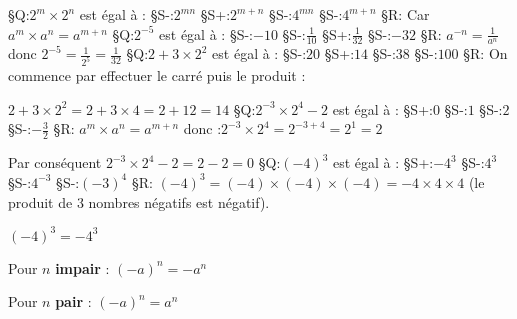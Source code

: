 
%
§Q:$2^{m}\times 2^{n}$ est égal à :
§S-:$2^{mn}$
§S+:$2^{m+n}$
§S-:$4^{mn}$
§S-:$4^{m+n}$
§R: Car $a^{m}\times a^{n}=a^{m+n}$
§Q:$2^{-5}$ est égal à :
§S-:$-10$
§S-:$\frac{1}{10}$
§S+:$\frac{1}{32}$
§S-:$-32$
§R: $a^{-n}=\frac{1}{a^{n}}$ donc $2^{-5}=\frac{1}{2^{5}}=\frac{1}{32}$
§Q:$2+3\times 2^{2}$ est égal à :
§S-:$20$
§S+:$14$
§S-:$38$
§S-:$100$
§R: On commence par effectuer le carré puis le produit :
\par
$2+3\times 2^{2} =2+3\times 4=2+12=14$
§Q:$2^{-3}\times 2^{4}-2$ est égal à :
§S+:$0$
§S-:$1$
§S-:$2$
§S-:$-\frac{3}{2}$
§R: $a^{m}\times a^{n}=a^{m+n}$ donc :$2^{-3}\times 2^{4}=2^{-3+4}=2^{1}=2$
\par
Par conséquent $2^{-3}\times 2^{4}-2=2-2=0$
§Q:$\left(-4\right)^{3}$ est égal à :
§S+:$-4^{3}$
§S-:$4^{3}$
§S-:$4^{-3}$
§S-:$\left(-3\right)^{4}$
§R: $\left(-4\right)^{3}=\left(-4\right)\times \left(-4\right)\times \left(-4\right)=-4\times 4\times 4$ (le produit de 3 nombres négatifs est négatif).
\par
$\left(-4\right)^{3}=-4^{3}$
\par
Pour $n$ \textbf{impair} : $\left(-a\right)^{n}=-a^{n}$
\par
Pour $n$ \textbf{pair} : $\left(-a\right)^{n}=a^{n}$
\par
